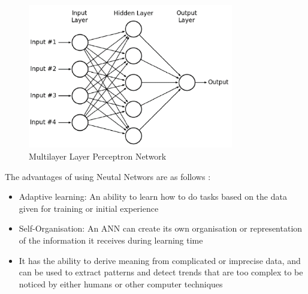 \documentclass[12pt]{report}
\begin{document}
\begin{figure}[H]
  \centering
  \includegraphics[width=0.8\textwidth]{Images/nn.png}
  \caption{Multilayer Layer Perceptron Network}
\end{figure}

The advantages of using Neutal Networs are as follows :
\begin{itemize}
    \item Adaptive learning: An ability to learn how to do tasks based on the data given for training or initial experience
    \item Self-Organisation: An ANN can create its own organisation or representation of the information it receives during learning time
    \item It has the ability to derive meaning from complicated or imprecise data, and can be used to extract patterns and detect trends that are too complex to be noticed by either humans or other computer techniques
\end{itemize}
\end{document}
